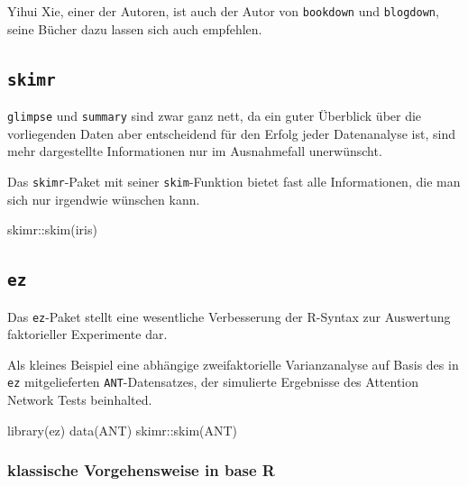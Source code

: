 \documentclass[
]{book}
\newenvironment{Shaded}{\begin{snugshade}}{\end{snugshade}}
\newcommand{\FunctionTok}[1]{\textcolor[rgb]{0.00,0.00,0.00}{#1}}
\newcommand{\NormalTok}[1]{#1}
\newcommand{\SpecialCharTok}[1]{\textcolor[rgb]{0.00,0.00,0.00}{#1}}
\begin{document}
Yihui Xie, einer der Autoren, ist auch der Autor von \texttt{bookdown} und \texttt{blogdown}, seine Bücher dazu lassen sich auch empfehlen.

\hypertarget{skimr}{%
\subsection{\texorpdfstring{\texttt{skimr}}{skimr}}\label{skimr}}

\texttt{glimpse} und \texttt{summary} sind zwar ganz nett, da ein guter Überblick über die vorliegenden Daten aber entscheidend für den Erfolg jeder Datenanalyse ist, sind mehr dargestellte Informationen nur im Ausnahmefall unerwünscht.

Das \texttt{skimr}-Paket mit seiner \texttt{skim}-Funktion bietet fast alle Informationen, die man sich nur irgendwie wünschen kann.

\begin{Shaded}
\begin{Highlighting}[]
\NormalTok{skimr}\SpecialCharTok{::}\FunctionTok{skim}\NormalTok{(iris)}
\end{Highlighting}
\end{Shaded}

\hypertarget{ez}{%
\subsection{\texorpdfstring{\texttt{ez}}{ez}}\label{ez}}

Das \texttt{ez}-Paket stellt eine wesentliche Verbesserung der R-Syntax zur Auswertung faktorieller Experimente dar.

Als kleines Beispiel eine abhängige zweifaktorielle Varianzanalyse auf Basis des in \texttt{ez} mitgelieferten \texttt{ANT}-Datensatzes, der simulierte Ergebnisse des Attention Network Tests beinhalted.

\begin{Shaded}
\begin{Highlighting}[]
\FunctionTok{library}\NormalTok{(ez)}
\FunctionTok{data}\NormalTok{(ANT)}
\NormalTok{skimr}\SpecialCharTok{::}\FunctionTok{skim}\NormalTok{(ANT)}
\end{Highlighting}
\end{Shaded}

\hypertarget{klassische-vorgehensweise-in-base-r}{%
\subsubsection{klassische Vorgehensweise in base R}\label{klassische-vorgehensweise-in-base-r}}
\end{document}
